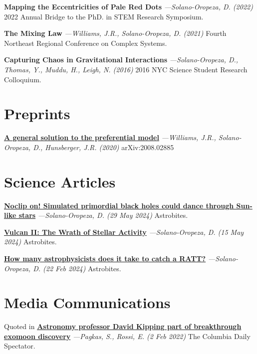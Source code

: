 \documentclass[a4paper,11pt]{article}
\begin{document}
    \textbf{Mapping the Eccentricities of Pale Red Dots} \textit{—Solano-Oropeza, D. (2022)} 2022 Annual Bridge to the PhD. in STEM Research Symposium.
    \vspace{1.5mm}
    
    \textbf{The Mixing Law} \textit{—Williams, J.R., Solano-Oropeza, D. (2021)} Fourth Northeast Regional Conference on Complex Systems.
    \vspace{1.5mm}
    
    \textbf{Capturing Chaos in Gravitational Interactions} \textit{—Solano-Oropeza, D., Thomas, Y., Muddu, H., Leigh, N. (2016)} 2016 NYC Science Student Research Colloquium.
    
\section{Preprints}
    {\href{https://arxiv.org/abs/2008.02885}{\textbf{A general solution to the preferential model}}} \textit{—Williams, J.R., Solano-Oropeza, D., Hunsberger, J.R. (2020)} arXiv:2008.02885

\section{Science Articles}

    {\href{https://astrobites.org/2024/05/29/noclip-on-simulated-primordial-black-holes-could-dance-through-sun-like-stars/}{\textbf{Noclip on! Simulated primordial black holes could dance through Sun-like stars}}} \textit{—Solano-Oropeza, D. (29 May 2024)} Astrobites.
    \vspace{1.5mm}

    {\href{https://astrobites.org/2024/02/22/how-many-astrophysicists-does-it-take-to-catch-a-ratt/}{\textbf{Vulcan II: The Wrath of Stellar Activity}}} \textit{—Solano-Oropeza, D. (15 May 2024)} Astrobites.
    \vspace{1.5mm}

    {\href{https://astrobites.org/2024/02/22/how-many-astrophysicists-does-it-take-to-catch-a-ratt/}{\textbf{How many astrophysicists does it take to catch a RATT?}}} \textit{—Solano-Oropeza, D. (22 Feb 2024)} Astrobites.
    \vspace{1.5mm}
    
\section{Media Communications}
    Quoted in {\href{https://www.columbiaspectator.com/news/2022/02/02/astronomy-professor-david-kipping-part-of-breakthrough-exomoon-discovery/}{\textbf{Astronomy professor David Kipping part of breakthrough exomoon discovery}}} \textit{—Pagkas, S., Rossi, E. (2 Feb 2022)} The Columbia Daily Spectator.
\end{document}
